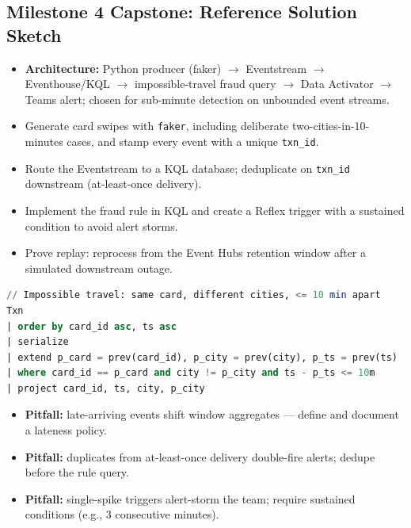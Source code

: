 \documentclass[11pt, a4paper]{article}
\begin{document}
\subsection*{Milestone 4 Capstone: Reference Solution Sketch}
\begin{itemize}[label=-, itemsep=0pt]
    \item \textbf{Architecture:} Python producer (faker) $\rightarrow$ Eventstream $\rightarrow$ Eventhouse/KQL $\rightarrow$ impossible-travel fraud query $\rightarrow$ Data Activator $\rightarrow$ Teams alert; chosen for sub-minute detection on unbounded event streams.
    \item Generate card swipes with \texttt{faker}, including deliberate two-cities-in-10-minutes cases, and stamp every event with a unique \texttt{txn\_id}.
    \item Route the Eventstream to a KQL database; deduplicate on \texttt{txn\_id} downstream (at-least-once delivery).
    \item Implement the fraud rule in KQL and create a Reflex trigger with a sustained condition to avoid alert storms.
    \item Prove replay: reprocess from the Event Hubs retention window after a simulated downstream outage.
\end{itemize}
\begin{lstlisting}[language=SQL]
// Impossible travel: same card, different cities, <= 10 min apart
Txn
| order by card_id asc, ts asc
| serialize
| extend p_card = prev(card_id), p_city = prev(city), p_ts = prev(ts)
| where card_id == p_card and city != p_city and ts - p_ts <= 10m
| project card_id, ts, city, p_city
\end{lstlisting}
\begin{itemize}[label=-, itemsep=0pt]
    \item \textbf{Pitfall:} late-arriving events shift window aggregates --- define and document a lateness policy.
    \item \textbf{Pitfall:} duplicates from at-least-once delivery double-fire alerts; dedupe before the rule query.
    \item \textbf{Pitfall:} single-spike triggers alert-storm the team; require sustained conditions (e.g., 3 consecutive minutes).
\end{itemize}
\end{document}
